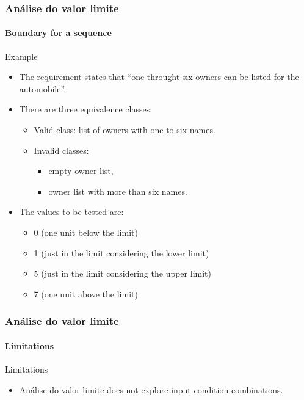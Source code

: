 \begin{frame}
\frametitle{Análise do valor limite}
\framesubtitle{Boundary for a sequence}

\begin{block}{Example}
\begin{itemize}
	\item The requirement states that ``one throught six owners can be listed
	for the automobile''.

	\item There are three equivalence classes:
	\begin{itemize}
		\item Valid class: list of owners with one to six names.
		\item Invalid classes:
		\begin{itemize}
			\item empty owner list,
			\item owner list with more than six names.
		\end{itemize}
	\end{itemize}

		\item The values to be tested are:
	\begin{itemize}
		\item 0 (one unit below the limit)
		\item 1 (just in the limit considering the lower limit)
		\item 5 (just in the limit considering the upper limit)
		\item 7 (one unit above the limit)
	\end{itemize}
\end{itemize}
\end{block}
\end{frame}


\begin{frame}[hasprev=true, hasnext=false]
\frametitle{Análise do valor limite}
\framesubtitle{Limitations}

\begin{block:fact}{Limitations}
\begin{itemize}
	\item Análise do valor limite does not explore input condition combinations.
\end{itemize}
\end{block:fact}
\end{frame}